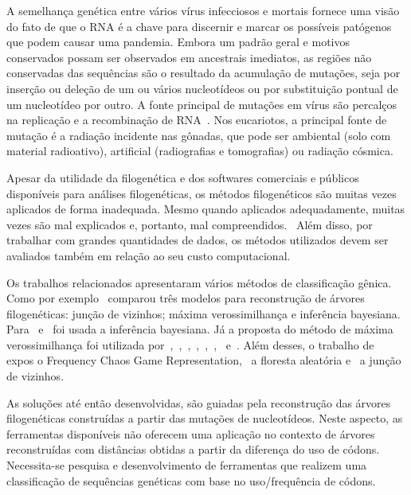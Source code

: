 \documentclass[font=plain]{abnt}
\begin{document}
A semelhança genética entre vários vírus infecciosos e mortais fornece uma visão do fato de que o RNA é a chave para discernir e marcar os possíveis patógenos que podem causar uma pandemia. Embora um padrão geral e motivos conservados possam ser observados em ancestrais imediatos, as regiões não conservadas das sequências são o resultado da acumulação de mutações, seja por inserção ou deleção de um ou vários nucleotídeos ou por substituição pontual de um nucleotídeo por outro. A fonte principal de mutações em vírus são percalços na replicação e a recombinação de RNA~\cite[p. 11]{behl_threat_2022}. Nos eucariotos, a principal fonte de mutação é a radiação incidente nas gônadas, que pode ser ambiental (solo com material radioativo), artificial (radiografias e tomografias) ou radiação cósmica.

Apesar da utilidade da filogenética e dos softwares comerciais e públicos disponíveis para análises filogenéticas, os métodos filogenéticos são muitas vezes aplicados de forma inadequada. Mesmo quando aplicados adequadamente, muitas vezes são mal explicados e, portanto, mal compreendidos.~\cite[p. 1]{barry_phylogenetic_analysis_2006} Além disso, por trabalhar com grandes quantidades de dados, os métodos utilizados devem ser avaliados também em relação ao seu custo computacional.

Os trabalhos relacionados apresentaram vários métodos de classificação gênica. Como por exemplo~\cite{dimitrov_updated_2019} comparou três modelos para reconstrução de árvores filogenéticas: junção de vizinhos; máxima verossimilhança e inferência bayesiana. Para~\cite{yin_systematic_2019} e~\cite{bedoya-pilozo_molecular_epidemiology_2018} foi usada a inferência bayesiana. Já a proposta do método de máxima verossimilhança foi utilizada por~\cite{fall_genetic_diversity_2021},~\cite{behl_threat_2022},~\cite{shabbir_comprehensive_2020},~\cite{hudu_hepatitis_2018},~\cite{sallard_tracing_2021},~\cite{paez-espino_diversity_evolution_2019},~\cite{tang_evolutionary_2021} e~\cite{cho_analysis_2022}. Além desses, o trabalho de~\cite{lichtblau_alignment-free_2019} expos o Frequency Chaos Game Representation,~\cite{kim_ngs_2022} a floresta aleatória e~\cite{potdar_phylogenetic_2021} a junção de vizinhos.

As soluções até então desenvolvidas, são guiadas pela reconstrução das árvores filogenéticas construídas a partir das mutações de nucleotídeos. Neste aspecto, as ferramentas disponíveis não oferecem uma aplicação no contexto de árvores reconstruídas com distâncias obtidas a partir da diferença do uso de códons. Necessita-se pesquisa e desenvolvimento de ferramentas que realizem uma classificação de sequências genéticas com base no uso/frequência de códons.
\end{document}
